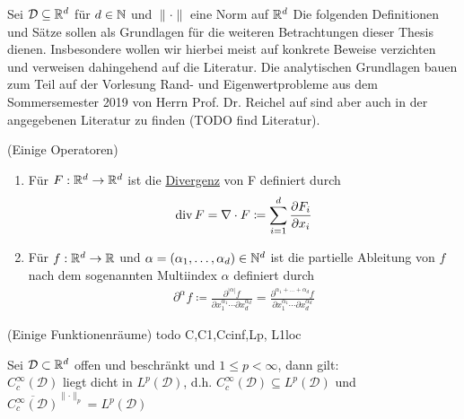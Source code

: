 Sei $\mathcal{D} \subseteq \mathbb{R}^d$ für $d\in \mathbb{N}$ und $\lVert \cdot \rVert$ eine Norm auf $\mathbb{R}^d$
Die folgenden Definitionen und Sätze sollen als Grundlagen für die weiteren Betrachtungen dieser Thesis dienen. Insbesondere wollen wir hierbei meist auf konkrete Beweise verzichten und verweisen dahingehend auf die Literatur. 
Die analytischen Grundlagen bauen zum Teil auf der Vorlesung Rand- und Eigenwertprobleme aus dem Sommersemester 2019 von Herrn Prof. Dr. Reichel auf sind aber auch in der angegebenen Literatur zu finden (TODO find Literatur).
\begin{Definition}(Einige Operatoren)
	\begin{enumerate}[label=(\alph*)]
		\item Für $F: \mathbb{R}^d \to \mathbb{R}^d$ ist die \underline{Divergenz} von F definiert durch
			\begin{align*}
				\operatorname{div} F = \nabla \cdot F \coloneqq \sum_{i=1}^{d} \frac{\partial F_i}{ \partial x_i}
			\end{align*}
		\item Für $f: \mathbb{R}^d \to \mathbb{R}$ und $\alpha = (\alpha_1,\dots,\alpha_d) \in \mathbb{N}^d$ ist die partielle Ableitung von $f$ nach dem sogenannten Multiindex $\alpha$ definiert durch
			\begin{align*}
				\partial^{\alpha}f \coloneqq 
				\frac{\partial^{|\alpha|} f}{\partial x_1 ^{\alpha_1} \cdots  \partial x_d^{\alpha_d} } 
				=\frac{\partial^{\alpha_1+\dots +\alpha_d} f}{\partial x_1 ^{\alpha_1} \cdots  \partial x_d^{\alpha_d} } 
			\end{align*}
	\end{enumerate}
\end{Definition}

\begin{Definition}(Einige Funktionenräume)
	todo C,C1,Ccinf,Lp, L1loc
\end{Definition}

\begin{Satz}
	Sei $ \mathcal{D} \subset \mathbb{R}^d $ offen und beschränkt und $ 1 \leq p < \infty $, dann gilt: \\
	$ C_c^{\infty} (\mathcal{D})$ liegt dicht in $ L^p(\mathcal{D}) $, d.h. $ C_c^{\infty}(\mathcal{D}) \subseteq L^p(\mathcal{D})$ und $ \overline{ C_c^{\infty}(\mathcal{D}) }^{\lVert \cdot \rVert_p}  = L^p(\mathcal{D})$
\end{Satz}



